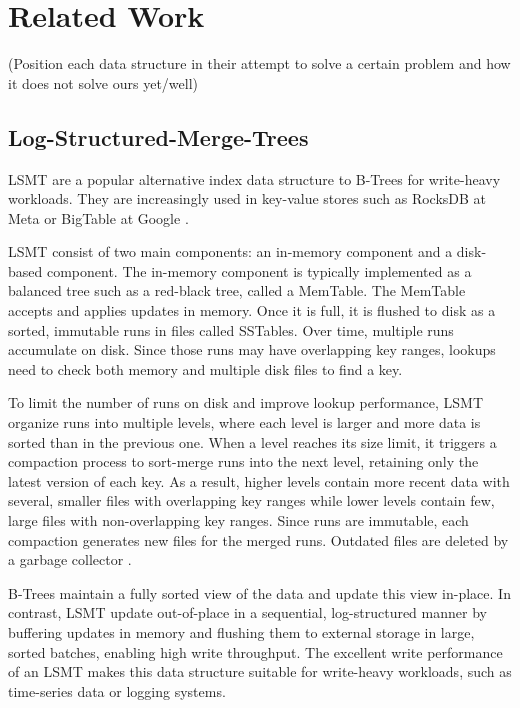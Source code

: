 \chapter{Related Work}
(Position each data structure in their attempt to solve a certain problem and how it does not solve ours yet/well)

\section{Log-Structured-Merge-Trees}

\ac{LSMT} \cite{oneil1996log} are a popular alternative index data structure to B-Trees for write-heavy workloads.
They are increasingly used in key-value stores such as RocksDB at Meta \cite{rocksdb} or BigTable at Google \cite{chang2008bigtable}.

\ac{LSMT} consist of two main components: an in-memory component and a disk-based component.
The in-memory component is typically implemented as a balanced tree such as a red-black tree, called a MemTable.
The MemTable accepts and applies updates in memory.
Once it is full, it is flushed to disk as a sorted, immutable runs in files called SSTables.
Over time, multiple runs accumulate on disk.
Since those runs may have overlapping key ranges, lookups need to check both memory and multiple disk files to find a key.

To limit the number of runs on disk and improve lookup performance, \ac{LSMT} organize runs into multiple levels, where each level is larger and more data is sorted than in the previous one.
When a level reaches its size limit, it triggers a compaction process to sort-merge runs into the next level, retaining only the latest version of each key.
As a result, higher levels contain more recent data with several, smaller files with overlapping key ranges while lower levels contain few, large files with non-overlapping key ranges.
Since runs are immutable, each compaction generates new files for the merged runs.
Outdated files are deleted by a garbage collector \cite{sarkar2022lsmt}.


B-Trees maintain a fully sorted view of the data and update this view in-place.
In contrast, \ac{LSMT} update out-of-place in a sequential, log-structured manner by buffering updates in memory and flushing them to external storage in large, sorted batches, enabling high write throughput.
The excellent write performance of an \ac{LSMT} makes this data structure suitable for write-heavy workloads, such as time-series data or logging systems.

